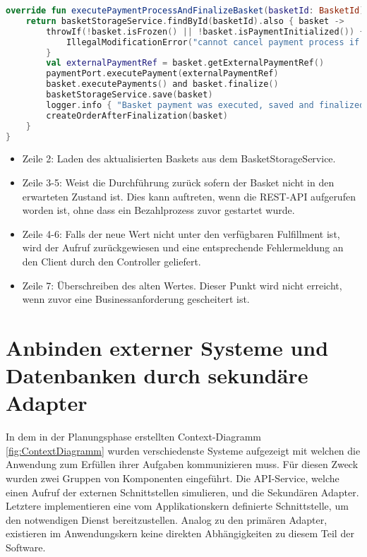 \begin{minipage}{\linewidth} %
	\begin{lstlisting}[caption={Ausführung des Bezahlvorgangs in einem Domainservice}, label={lst:domainservice}, language=Kotlin]
override fun executePaymentProcessAndFinalizeBasket(basketId: BasketId): Basket {
	return basketStorageService.findById(basketId).also { basket ->
		throwIf(!basket.isFrozen() || !basket.isPaymentInitialized()) {
			IllegalModificationError("cannot cancel payment process if not initialized")
		}
		val externalPaymentRef = basket.getExternalPaymentRef()
		paymentPort.executePayment(externalPaymentRef)
		basket.executePayments() and basket.finalize()
		basketStorageService.save(basket)
		logger.info { "Basket payment was executed, saved and finalized" }
		createOrderAfterFinalization(basket)
	}
}
	\end{lstlisting}
\end{minipage}

\begin{itemize}[noitemsep,nolistsep]
	\item Zeile 2: Laden des aktualisierten Baskets aus dem BasketStorageService.
	\item Zeile 3-5: Weist die Durchführung zurück sofern der Basket nicht in den erwarteten Zustand ist. Dies kann auftreten, wenn die REST-API aufgerufen worden ist, ohne dass ein Bezahlprozess zuvor gestartet wurde.
	\item Zeile 4-6: Falls der neue Wert nicht unter den verfügbaren Fulfillment ist, wird der Aufruf zurückgewiesen und eine entsprechende Fehlermeldung an den Client durch den Controller geliefert.
	\item Zeile 7: Überschreiben des alten Wertes. Dieser Punkt wird nicht erreicht, wenn zuvor eine Businessanforderung gescheitert ist.
\end{itemize}

\section{Anbinden externer Systeme und Datenbanken durch sekundäre Adapter}

In dem in der Planungsphase erstellten Context-Diagramm \ref{fig:ContextDiagramm} wurden verschiedenste Systeme aufgezeigt mit welchen die Anwendung zum Erfüllen ihrer Aufgaben kommunizieren muss. Für diesen Zweck wurden zwei Gruppen von Komponenten eingeführt. Die API-Service, welche einen Aufruf der externen Schnittstellen simulieren, und die Sekundären Adapter. Letztere implementieren eine vom Applikationskern definierte Schnittstelle, um den notwendigen Dienst bereitzustellen. Analog zu den primären Adapter, existieren im Anwendungskern keine direkten Abhängigkeiten zu diesem Teil der Software.

